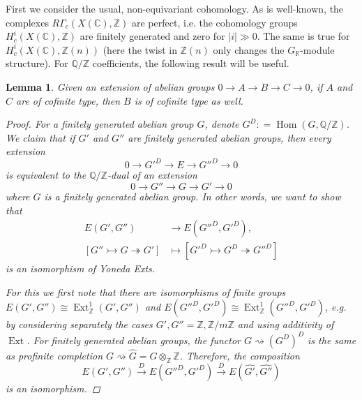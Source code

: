 \documentclass[draft,leqno,12pt]{article}
\theoremstyle{plain}
\newtheorem{lemma}[theorem]{\indent\sc Lemma}
\theoremstyle{definition}
\DeclareMathOperator{\Hom}{Hom}
\DeclareMathOperator{\Ext}{Ext}
\newcommand{\ZZ}{\mathbb{Z}}
\newcommand{\QQ}{\mathbb{Q}}
\newcommand{\RR}{\mathbb{R}}
\newcommand{\CC}{\mathbb{C}}
\newcommand{\dfn}{\mathrel{\mathop:}=}
\begin{document}
First we consider the usual, non-equivariant cohomology. As is well-known, the
complexes $R\Gamma_c (X (\CC), \ZZ)$ are perfect, i.e. the cohomology groups
$H^i_c (X (\CC), \ZZ)$ are finitely generated and zero for $|i| \gg 0$.  The
same is true for $H^i_c (X (\CC), \ZZ (n))$ (here the twist in $\ZZ (n)$ only
changes the $G_\RR$-module structure). For $\QQ/\ZZ$ coefficients, the following
result will be useful.

\begin{lemma}
  \label{lemma:extensions-of-cofinite-type-groups}
  Given an extension of abelian groups
  $0 \to A \to B \to C \to 0$,
  if $A$ and $C$ are of cofinite type, then $B$ is of cofinite type as well.

  \begin{proof}
    For a finitely generated abelian group $G$, denote
    $G^D \dfn \Hom (G, \QQ/\ZZ)$.  We claim that if $G'$ and $G''$ are finitely
    generated abelian groups, then every extension
    $$0 \to G'^D \to E \to G''^D \to 0$$
    is equivalent to the $\QQ/\ZZ$-dual of an extension
    $$0 \to G'' \to G \to G' \to 0$$
    where $G$ is a finitely generated abelian group. In other words,
    we want to show that
    \begin{align*}
      E (G',G'') & \to E (G''^D,G'^D),\\
      [G'' \rightarrowtail G \twoheadrightarrow G'] & \mapsto
      [G'^D \rightarrowtail G^D \twoheadrightarrow G''^D]
    \end{align*}
    is an isomorphism of Yoneda Exts.

    For this we first note that there are isomorphisms of finite groups
    $E (G',G'') \cong \Ext_\ZZ^1 (G',G'')$ and
    $E (G''^D, G'^D) \cong \Ext_\ZZ^1 (G''^D, G'^D)$, e.g. by considering
    separately the cases $G', G'' = \ZZ, \ZZ/m\ZZ$ and using additivity of
    $\Ext$. For finitely generated abelian groups, the functor
    $G \rightsquigarrow (G^D)^D$ is the same as profinite completion
    $G \rightsquigarrow \widehat{G} = G\otimes_\ZZ \widehat{\ZZ}$. Therefore,
    the composition
    \[ E (G',G'') \xrightarrow{D}
    E (G''^D,G'^D) \xrightarrow{D}
    E (\widehat{G'},\widehat{G''}) \]
    is an isomorphism.
  \end{proof}
\end{lemma}
\end{document}
